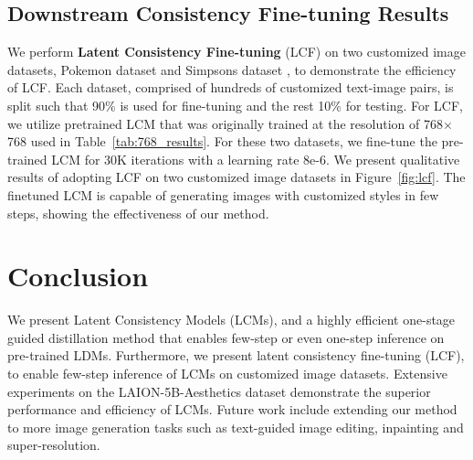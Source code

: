 \documentclass{article} %
\begin{document}
\vspace{-10pt}
\subsection{Downstream Consistency Fine-tuning Results \label{sec:lcf}}
\vspace{-5pt}
We perform \textbf{Latent Consistency Fine-tuning} (LCF) on two customized image datasets, Pokemon dataset \citep{pinkney2022pokemon} and Simpsons dataset \citep{norod2022simpsons}, to demonstrate the efficiency of LCF.
Each dataset, comprised of hundreds of customized text-image pairs, is split such that 90\% is used for fine-tuning and the rest 10\% for testing. For LCF, we utilize pretrained LCM that was originally trained at the resolution of 768$\times$768 used in Table~\ref{tab:768_results}. For these two datasets, we fine-tune the pre-trained LCM for 30K iterations with a learning rate 8e-6. We present qualitative results of adopting LCF on two customized image datasets in Figure~\ref{fig:lcf}. The finetuned LCM is capable of generating images with customized styles in few steps, showing the effectiveness of our method.



\vspace{-12pt}
\section{Conclusion}
\vspace{-8pt}
We present Latent Consistency Models (LCMs), and a highly efficient one-stage guided distillation method that enables few-step or even one-step inference on pre-trained LDMs.
Furthermore, we present latent consistency fine-tuning (LCF), to enable few-step inference of LCMs on customized image datasets. Extensive experiments on the LAION-5B-Aesthetics dataset demonstrate the superior performance and efficiency of LCMs.
Future work include extending our method to more image generation tasks such as 
text-guided image editing, inpainting and super-resolution.


\end{document}
